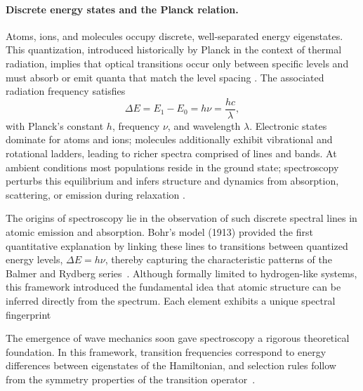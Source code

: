 \paragraph{Discrete energy states and the Planck relation.}
Atoms, ions, and molecules occupy discrete, well-separated energy eigenstates. This quantization, introduced historically by Planck in the context of thermal radiation, implies that optical transitions occur only between specific levels and must absorb or emit quanta that match the level spacing \cite{skoogetal2017principlesinstrumentalanalysis}. The associated radiation frequency satisfies
\begin{equation}
    \Delta E = E_1 - E_0 = h\nu = \frac{hc}{\lambda},
    \label{final:eq:planck_relation}
\end{equation}
with Planck's constant $h$, frequency $\nu$, and wavelength $\lambda$. Electronic states dominate for atoms and ions; molecules additionally exhibit vibrational and rotational ladders, leading to richer spectra comprised of lines and bands. At ambient conditions most populations reside in the ground state; spectroscopy perturbs this equilibrium and infers structure and dynamics from absorption, scattering, or emission during relaxation \cite{skoogetal2017principlesinstrumentalanalysis}.


The origins of spectroscopy lie in the observation of such discrete spectral lines in atomic emission and absorption. Bohr’s model (1913) provided the first quantitative explanation by linking these lines to transitions between quantized energy levels, $\Delta E = h\nu$, thereby capturing the characteristic patterns of the Balmer and Rydberg series~\cite{bohr1913constitutionatomsmolecules, rydberg1890rybergsseriesrydberg1890xxxivstructurelinespectra, balmer1885notizuberspectrallinien}. Although formally limited to hydrogen-like systems, this framework introduced the fundamental idea that atomic structure can be inferred directly from the spectrum. Each element exhibits a unique spectral fingerprint%

The emergence of wave mechanics soon gave spectroscopy a rigorous theoretical foundation.
In this framework, transition frequencies correspond to energy differences between eigenstates of the Hamiltonian, and selection rules follow from the symmetry properties of the transition operator~\cite{dirac1927quantumtheoryemission}. %


